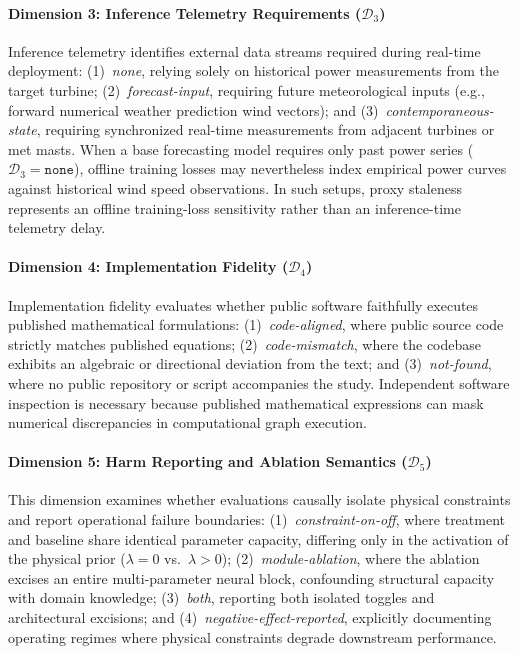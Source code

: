 \paragraph{Dimension 3: Inference Telemetry Requirements ($\mathcal{D}_3$)}
Inference telemetry identifies external data streams required during real-time deployment:
(1)~\textit{none}, relying solely on historical power measurements from the target turbine;
(2)~\textit{forecast-input}, requiring future meteorological inputs (e.g., forward numerical weather prediction wind vectors); and
(3)~\textit{contemporaneous-state}, requiring synchronized real-time measurements from adjacent turbines or met masts.
When a base forecasting model requires only past power series ($\mathcal{D}_3 = \texttt{none}$), offline training losses may nevertheless index empirical power curves against historical wind speed observations. In such setups, proxy staleness represents an offline training-loss sensitivity rather than an inference-time telemetry delay.

\paragraph{Dimension 4: Implementation Fidelity ($\mathcal{D}_4$)}
Implementation fidelity evaluates whether public software faithfully executes published mathematical formulations:
(1)~\textit{code-aligned}, where public source code strictly matches published equations;
(2)~\textit{code-mismatch}, where the codebase exhibits an algebraic or directional deviation from the text; and
(3)~\textit{not-found}, where no public repository or script accompanies the study.
Independent software inspection is necessary because published mathematical expressions can mask numerical discrepancies in computational graph execution.

\paragraph{Dimension 5: Harm Reporting and Ablation Semantics ($\mathcal{D}_5$)}
This dimension examines whether evaluations causally isolate physical constraints and report operational failure boundaries:
(1)~\textit{constraint-on-off}, where treatment and baseline share identical parameter capacity, differing only in the activation of the physical prior ($\lambda=0$ vs.\ $\lambda>0$);
(2)~\textit{module-ablation}, where the ablation excises an entire multi-parameter neural block, confounding structural capacity with domain knowledge;
(3)~\textit{both}, reporting both isolated toggles and architectural excisions; and
(4)~\textit{negative-effect-reported}, explicitly documenting operating regimes where physical constraints degrade downstream performance.

